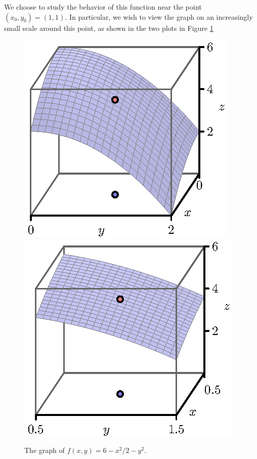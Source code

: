 We choose to study the behavior of this function near the point $(x_0,
y_0) = (1,1)$.  In particular, we wish to view the graph on an
increasingly small scale around this point, as shown in the two plots in Figure
\ref{F:10.4.tangent.2}

\begin{figure}[ht]
  \begin{center}
    \includegraphics{figures/fig_10_4_tangent_2.eps} \hspace*{20pt}
    \includegraphics{figures/fig_10_4_tangent_3.eps}
  \end{center}
  \caption{The graph of $f(x,y)=6-x^2/2 - y^2$.}
  \label{F:10.4.tangent.2}
\end{figure}

